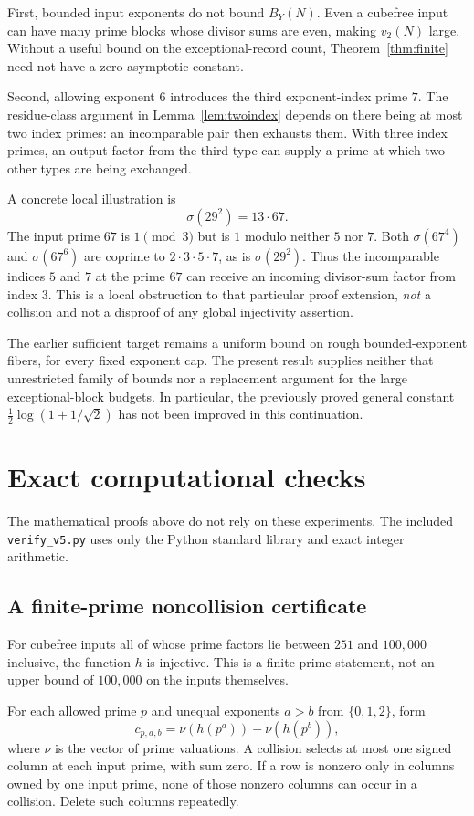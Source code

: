 \documentclass[11pt]{article}
\begin{document}
First, bounded input exponents do not bound $B_Y(N)$. Even a cubefree input can have many prime blocks whose divisor sums are even, making $v_2(N)$ large. Without a useful bound on the exceptional-record count, Theorem~\ref{thm:finite} need not have a zero asymptotic constant.

Second, allowing exponent $6$ introduces the third exponent-index prime $7$. The residue-class argument in Lemma~\ref{lem:twoindex} depends on there being at most two index primes: an incomparable pair then exhausts them. With three index primes, an output factor from the third type can supply a prime at which two other types are being exchanged.

A concrete local illustration is
\[
 \sigma(29^2)=13\cdot67.
\]
The input prime $67$ is $1\pmod3$ but is $1$ modulo neither $5$ nor $7$. Both $\sigma(67^4)$ and $\sigma(67^6)$ are coprime to $2\cdot3\cdot5\cdot7$, as is $\sigma(29^2)$. Thus the incomparable indices $5$ and $7$ at the prime $67$ can receive an incoming divisor-sum factor from index $3$. This is a local obstruction to that particular proof extension, \emph{not} a collision and not a disproof of any global injectivity assertion.

The earlier sufficient target remains a uniform bound on rough bounded-exponent fibers, for every fixed exponent cap. The present result supplies neither that unrestricted family of bounds nor a replacement argument for the large exceptional-block budgets. In particular, the previously proved general constant $\tfrac12\log(1+1/\sqrt2)$ has not been improved in this continuation.

\section{Exact computational checks}
The mathematical proofs above do not rely on these experiments. The included \texttt{verify\_v5.py} uses only the Python standard library and exact integer arithmetic.

\subsection*{A finite-prime noncollision certificate}
For cubefree inputs all of whose prime factors lie between $251$ and $100{,}000$ inclusive, the function $h$ is injective. This is a finite-prime statement, not an upper bound of $100{,}000$ on the inputs themselves.

For each allowed prime $p$ and unequal exponents $a>b$ from $\{0,1,2\}$, form
\[
 c_{p,a,b}=\nu(h(p^a))-\nu(h(p^b)),
\]
where $\nu$ is the vector of prime valuations. A collision selects at most one signed column at each input prime, with sum zero. If a row is nonzero only in columns owned by one input prime, none of those nonzero columns can occur in a collision. Delete such columns repeatedly.
\end{document}
